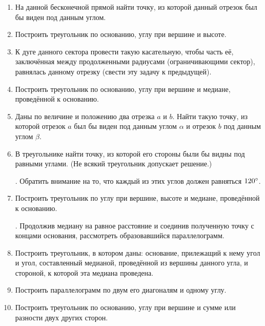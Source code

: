 \documentclass[oneside]{book}
\begin{document}
\begin{center}
\end{center}

\begin{enumerate}[resume]

 \item
На данной бесконечной прямой найти точку, из которой данный отрезок был бы виден под данным углом.

 \item
Построить треугольник по основанию, углу при вершине и высоте.

 \item
К дуге данного сектора провести такую касательную, чтобы часть её, заключённая между продолженными радиусами (ограничивающими сектор), равнялась данному отрезку (свести эту задачу к предыдущей).

 \item
Построить треугольник по основанию, углу при вершине и медиане, проведённой к основанию.

 \item
Даны по величине и положению два отрезка $a$ и $b$.
Найти такую точку, из которой отрезок $a$ был бы виден под данным углом $\alpha$ и отрезок $b$ под данным углом $\beta$.

 \item
В треугольнике найти точку, из которой его стороны были бы видны под равными углами.
(Не всякий треугольник допускает решение.)

.
Обратить внимание на то, что каждый из этих углов должен равняться $120\degree$.

 \item
Построить треугольник по углу при вершине, высоте и медиане, проведённой к основанию.

.
Продолжив медиану на равное расстояние и соединив полученную точку с концами основания, рассмотреть образовавшийся параллелограмм.

 \item
Построить треугольник, в котором даны:
основание, прилежащий к нему угол и угол, составленный медианой, проведённой из вершины данного угла, и стороной, к которой эта медиана проведена.

 \item
Построить параллелограмм по двум его диагоналям и одному углу.

 \item
Построить треугольник по основанию, углу при вершине и сумме или разности двух других сторон.


\end{enumerate}
\end{document}
